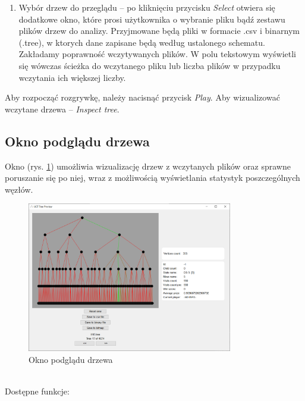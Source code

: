 \documentclass{article}
\begin{document}
\begin{enumerate}
	\item Wybór drzew do przeglądu – po kliknięciu przycisku \textit{Select} otwiera się dodatkowe okno, które prosi użytkownika o wybranie pliku bądź zestawu plików drzew do analizy. Przyjmowane będą pliki w formacie .csv i binarnym (.tree), w ktorych dane zapisane będą według ustalonego schematu. Zakładamy poprawność wczytywanych plików. W polu tekstowym wyświetli się wówczas ścieżka do wczytanego pliku lub liczba plików w przypadku wczytania ich większej liczby.\\
\end{enumerate}
Aby rozpocząć rozgrywkę, należy nacisnąć przycisk \textit{Play}. Aby wizualizować wczytane drzewa – \textit{Inspect tree}.
\pagebreak
\subsection{Okno podglądu drzewa}
Okno (rys. \ref{rys:treewindow}) umożliwia wizualizację drzew z wczytanych plików oraz sprawne poruszanie się po niej, wraz z możliwością wyświetlania statystyk poszczególnych węzłów.
\begin{figure}[h]
	\centering
	\includegraphics[width=0.8\textwidth]{tree-window}
	\caption{Okno podglądu drzewa}
	\label{rys:treewindow}
\end{figure}\\
Dostępne funkcje:\\
\end{document}
